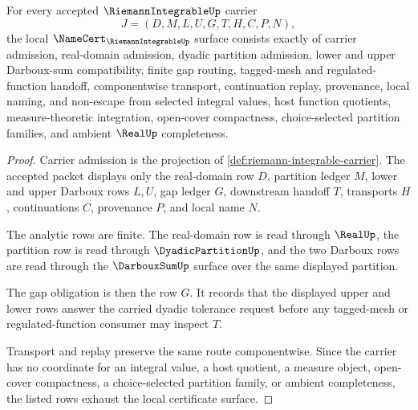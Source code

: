 \begin{theorem}
\label{thm:riemann-integrable-namecert-obligations}
For every accepted $\RiemannIntegrableUp$ carrier
$$
J=(D,M,L,U,G,T,H,C,P,N),
$$
the local $\NameCert_{\RiemannIntegrableUp}$ surface consists exactly of carrier admission, real-domain admission, dyadic partition admission, lower and upper Darboux-sum compatibility, finite gap routing, tagged-mesh and regulated-function handoff, componentwise transport, continuation replay, provenance, local naming, and non-escape from selected integral values, host function quotients, measure-theoretic integration, open-cover compactness, choice-selected partition families, and ambient $\RealUp$ completeness.
\end{theorem}
\begin{proof}
Carrier admission is the projection of \autoref{def:riemann-integrable-carrier}. The accepted packet displays only the real-domain row $D$, partition ledger $M$, lower and upper Darboux rows $L,U$, gap ledger $G$, downstream handoff $T$, transports $H$, continuations $C$, provenance $P$, and local name $N$.

The analytic rows are finite. The real-domain row is read through $\RealUp$, the partition row is read through $\DyadicPartitionUp$, and the two Darboux rows are read through the $\DarbouxSumUp$ surface over the same displayed partition.

The gap obligation is then the row $G$. It records that the displayed upper and lower rows answer the carried dyadic tolerance request before any tagged-mesh or regulated-function consumer may inspect $T$.

Transport and replay preserve the same route componentwise. Since the carrier has no coordinate for an integral value, a host quotient, a measure object, open-cover compactness, a choice-selected partition family, or ambient completeness, the listed rows exhaust the local certificate surface.
\end{proof}


